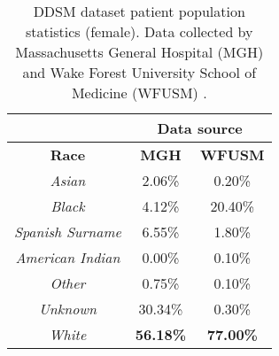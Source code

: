 \begin{table}[h]
\centering
\begin{tabular}{c|c|c|}
\cline{2-3}
\textbf{}                                      & \multicolumn{2}{c|}{\textbf{Data source}} \\ \hline
\multicolumn{1}{|c|}{\textbf{Race}}            & \textbf{MGH}       & \textbf{WFUSM}       \\ \hline
\multicolumn{1}{|c|}{\textit{Asian}}           & 2.06\%             & 0.20\%               \\ \hline
\multicolumn{1}{|c|}{\textit{Black}}           & 4.12\%             & 20.40\%              \\ \hline
\multicolumn{1}{|c|}{\textit{Spanish Surname}} & 6.55\%             & 1.80\%               \\ \hline
\multicolumn{1}{|c|}{\textit{American Indian}} & 0.00\%             & 0.10\%               \\ \hline
\multicolumn{1}{|c|}{\textit{Other}}           & 0.75\%             & 0.10\%               \\ \hline
\multicolumn{1}{|c|}{\textit{Unknown}}         & 30.34\%            & 0.30\%               \\ \hline
\multicolumn{1}{|c|}{\textit{White}}           & \textbf{56.18\%}            & \textbf{77.00\%}              \\ \hline
\end{tabular}
\caption{DDSM dataset patient population statistics (female). Data collected by Massachusetts General Hospital (MGH) and Wake Forest University School of Medicine (WFUSM) \citep{MichaelHeathKevinBowyerDanielKopans2001}.}
\label{tab:conclusion-ddsm-patient-population}
\end{table}